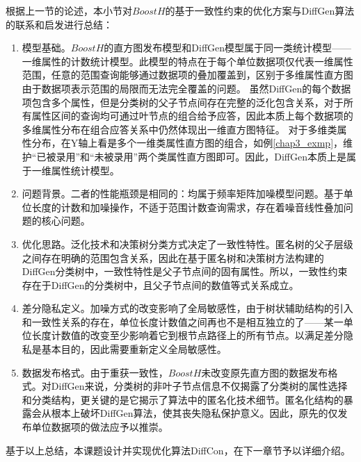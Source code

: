 根据上一节的论述，本小节对$BoostH$的基于一致性约束的优化方案与DiffGen算法的联系和启发进行总结：
\begin{enumerate}
	\item 模型基础。$BoostH$的直方图发布模型和DiffGen模型属于同一类统计模型——一维属性的计数统计模型。此模型的特点在于每个单位数据项仅代表一维属性范围，任意的范围查询能够通过数据项的叠加覆盖到，区别于多维属性直方图由于数据项表示范围的局限而无法完全覆盖的问题。
	虽然DiffGen的每个数据项包含多个属性，但是分类树的父子节点间存在完整的泛化包含关系，对于所有属性区间的查询均可通过叶节点的组合给予应答，因此本质上每个数据项的多维属性分布在组合应答关系中仍然体现出一维直方图特征。
	对于多维类属性分布，在Y轴上看是多个一维类属性直方图的组合，如例\ref{chap3_exmp}，维护“已被录用”和“未被录用”两个类属性直方图即可。因此，DiffGen本质上是属于一维属性统计模型。
	\item 问题背景。二者的性能瓶颈是相同的：均属于频率矩阵加噪模型问题。基于单位长度的计数和加噪操作，不适于范围计数查询需求，存在着噪音线性叠加问题的核心问题。
	\item 优化思路。泛化技术和决策树分类方式决定了一致性特性。匿名树的父子层级之间存在明确的范围包含关系，因此在基于匿名树和决策树方法构建的DiffGen分类树中，一致性特性是父子节点间的固有属性。所以，一致性约束存在于DiffGen的分类树中，且父子节点间的数值等式关系成立。
	\item 差分隐私定义。加噪方式的改变影响了全局敏感性，由于树状辅助结构的引入和一致性关系的存在，单位长度计数值之间再也不是相互独立的了——某一单位长度计数值的改变至少影响着它到根节点路径上的所有节点。以满足差分隐私是基本目的，因此需要重新定义全局敏感性。
	\item 数据发布格式。由于重获一致性，$BoostH$未改变原先直方图的数据发布格式。对DiffGen来说，分类树的非叶子节点信息不仅揭露了分类树的属性选择和分类结构，更关键的是它揭示了算法中的匿名化技术细节。匿名化结构的暴露会从根本上破坏DiffGen算法，使其丧失隐私保护意义。因此，原先的仅发布单位数据项的做法应予以推崇。
	
\end{enumerate}

基于以上总结，本课题设计并实现优化算法DiffCon，在下一章节予以详细介绍。